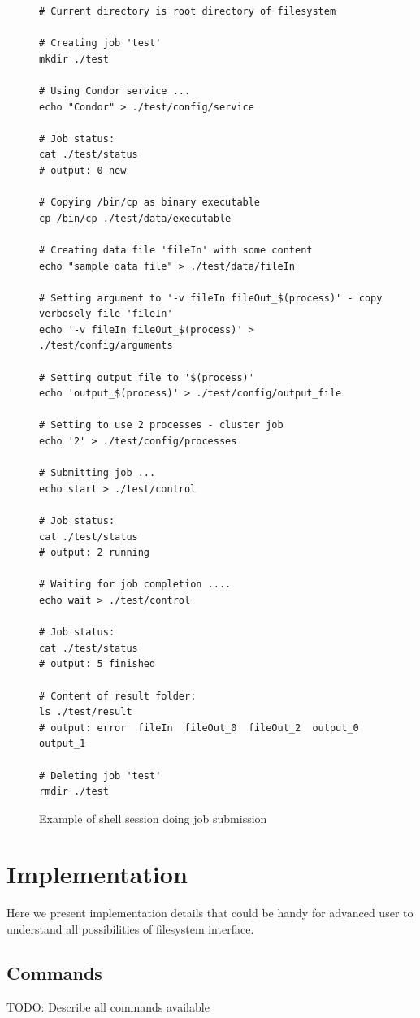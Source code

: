 \documentclass[a4paper,10pt,twocolumn]{article}
\begin{document}
\begin{figure}
  \begin{verbatim}
# Current directory is root directory of filesystem

# Creating job 'test'
mkdir ./test

# Using Condor service ...
echo "Condor" > ./test/config/service

# Job status:
cat ./test/status
# output: 0	new

# Copying /bin/cp as binary executable
cp /bin/cp ./test/data/executable

# Creating data file 'fileIn' with some content
echo "sample data file" > ./test/data/fileIn

# Setting argument to '-v fileIn fileOut_$(process)' - copy verbosely file 'fileIn'
echo '-v fileIn fileOut_$(process)' > ./test/config/arguments

# Setting output file to '$(process)'
echo 'output_$(process)' > ./test/config/output_file

# Setting to use 2 processes - cluster job
echo '2' > ./test/config/processes

# Submitting job ...
echo start > ./test/control

# Job status:
cat ./test/status
# output: 2	running

# Waiting for job completion ....
echo wait > ./test/control

# Job status:
cat ./test/status
# output: 5	finished

# Content of result folder:
ls ./test/result
# output: error  fileIn  fileOut_0  fileOut_2  output_0  output_1

# Deleting job 'test'
rmdir ./test
  \end{verbatim}
  \caption{Example of shell session doing job submission}
  \label{example}
\end{figure}


\section{Implementation}

Here we present implementation details that could be handy for advanced user to understand all possibilities of filesystem interface.

\subsection{Commands}

TODO: Describe all commands available
\end{document}
